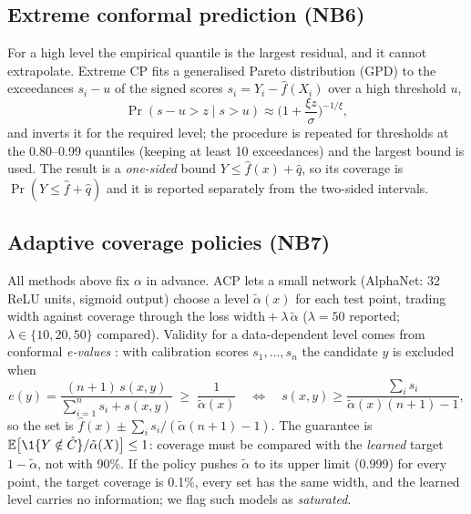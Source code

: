 \documentclass[11pt]{article}
\begin{document}
\subsection{Extreme conformal prediction (NB6)}
For a high level the empirical quantile is the largest residual, and it cannot extrapolate. Extreme CP \cite{pasche2025extreme}
fits a generalised Pareto distribution (GPD) \cite{pickands1975gpd} to the exceedances $s_i-u$ of the signed scores
$s_i=Y_i-\hat f(X_i)$ over a high threshold $u$,
\begin{equation}
\Pr(s-u>z\mid s>u)\approx\Big(1+\frac{\xi z}{\sigma}\Big)^{-1/\xi},
\end{equation}
and inverts it for the required level; the procedure is repeated for thresholds at the 0.80--0.99 quantiles (keeping at least 10
exceedances) and the largest bound is used. The result is a \emph{one-sided} bound $Y\le\hat f(x)+\hat q$, so its coverage is
$\Pr(Y\le\hat f+\hat q)$ and it is reported separately from the two-sided intervals.

\subsection{Adaptive coverage policies (NB7)}
All methods above fix $\alpha$ in advance. ACP \cite{gauthier2026acp} lets a small network (AlphaNet: 32 ReLU units, sigmoid
output) choose a level $\tilde\alpha(x)$ for each test point, trading width against coverage through the loss
$\text{width}+\lambda\,\tilde\alpha$ ($\lambda=50$ reported; $\lambda\in\{10,20,50\}$ compared). Validity for a data-dependent level
comes from conformal \emph{e-values} \cite{vovk2021evalues,gauthier2025evalues}: with calibration scores $s_1,\dots,s_n$ the
candidate $y$ is excluded when
\begin{equation}
e(y)=\frac{(n+1)\,s(x,y)}{\sum_{i=1}^ns_i+s(x,y)}\;\ge\;\frac1{\tilde\alpha(x)}
\quad\Longleftrightarrow\quad s(x,y)\ge\frac{\sum_is_i}{\tilde\alpha(x)(n+1)-1},
\end{equation}
so the set is $\hat f(x)\pm\sum_is_i/(\tilde\alpha(n+1)-1)$. The guarantee is $\mathbb E\big[\1\{Y\notin\hat C\}/\tilde\alpha(X)\big]\le1$:
coverage must be compared with the \emph{learned} target $1-\tilde\alpha$, not with 90\%. If the policy pushes $\tilde\alpha$ to its
upper limit (0.999) for every point, the target coverage is 0.1\%, every set has the same width, and the learned level carries no
information; we flag such models as \emph{saturated}.
\end{document}
